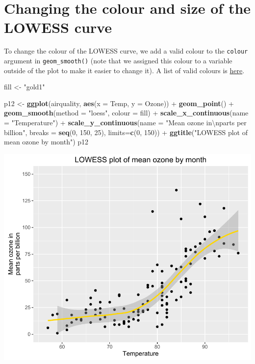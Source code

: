 \documentclass[]{article}
\newenvironment{Shaded}{\begin{snugshade}}{\end{snugshade}}
\newcommand{\KeywordTok}[1]{\textcolor[rgb]{0.13,0.29,0.53}{\textbf{{#1}}}}
\newcommand{\DataTypeTok}[1]{\textcolor[rgb]{0.13,0.29,0.53}{{#1}}}
\newcommand{\DecValTok}[1]{\textcolor[rgb]{0.00,0.00,0.81}{{#1}}}
\newcommand{\CharTok}[1]{\textcolor[rgb]{0.31,0.60,0.02}{{#1}}}
\newcommand{\StringTok}[1]{\textcolor[rgb]{0.31,0.60,0.02}{{#1}}}
\newcommand{\NormalTok}[1]{{#1}}
\begin{document}
\section{Changing the colour and size of the LOWESS
curve}\label{changing-the-colour-and-size-of-the-lowess-curve}

To change the colour of the LOWESS curve, we add a valid colour to the
\texttt{colour} argument in \texttt{geom\_smooth()} (note that we
assigned this colour to a variable outside of the plot to make it easier
to change it). A list of valid colours is
\href{http://www.stat.columbia.edu/~tzheng/files/Rcolor.pdf}{here}.

\begin{Shaded}
\begin{Highlighting}[]
\NormalTok{fill <-}\StringTok{ "gold1"}

\NormalTok{p12 <-}\StringTok{ }\KeywordTok{ggplot}\NormalTok{(airquality, }\KeywordTok{aes}\NormalTok{(}\DataTypeTok{x =} \NormalTok{Temp, }\DataTypeTok{y =} \NormalTok{Ozone)) +}\StringTok{ }
\StringTok{  }\KeywordTok{geom_point}\NormalTok{() +}\StringTok{ }
\StringTok{  }\KeywordTok{geom_smooth}\NormalTok{(}\DataTypeTok{method =} \StringTok{"loess"}\NormalTok{, }\DataTypeTok{colour =} \NormalTok{fill) +}
\StringTok{  }\KeywordTok{scale_x_continuous}\NormalTok{(}\DataTypeTok{name =} \StringTok{"Temperature"}\NormalTok{) +}
\StringTok{  }\KeywordTok{scale_y_continuous}\NormalTok{(}\DataTypeTok{name =} \StringTok{"Mean ozone in}\CharTok{\textbackslash{}n}\StringTok{parts per billion"}\NormalTok{,}
                     \DataTypeTok{breaks =} \KeywordTok{seq}\NormalTok{(}\DecValTok{0}\NormalTok{, }\DecValTok{150}\NormalTok{, }\DecValTok{25}\NormalTok{), }\DataTypeTok{limits=}\KeywordTok{c}\NormalTok{(}\DecValTok{0}\NormalTok{, }\DecValTok{150}\NormalTok{)) +}
\StringTok{  }\KeywordTok{ggtitle}\NormalTok{(}\StringTok{"LOWESS plot of mean ozone by month"}\NormalTok{)}
\NormalTok{p12}
\end{Highlighting}
\end{Shaded}

\begin{center}\includegraphics{12_Lowess_Plots_pdf/lowess_9-1} \end{center}
\end{document}

